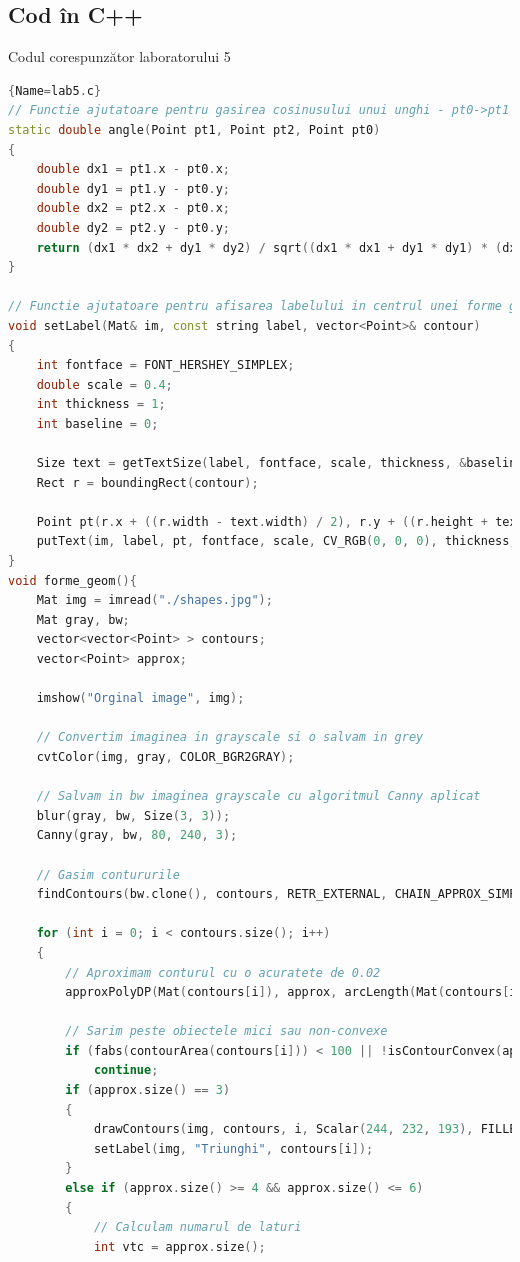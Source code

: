 \documentclass{amsart}
\begin{document}
\subsection{Cod \^{i}n C++}

Codul corespunzător laboratorului 5

\begin{lstlisting}[language=C++]{Name=lab5.c}
// Functie ajutatoare pentru gasirea cosinusului unui unghi - pt0->pt1 si pt0->pt2
static double angle(Point pt1, Point pt2, Point pt0)
{
	double dx1 = pt1.x - pt0.x;
	double dy1 = pt1.y - pt0.y;
	double dx2 = pt2.x - pt0.x;
	double dy2 = pt2.y - pt0.y;
	return (dx1 * dx2 + dy1 * dy2) / sqrt((dx1 * dx1 + dy1 * dy1) * (dx2 * dx2 + dy2 * dy2) + 1e-10);
}

// Functie ajutatoare pentru afisarea labelului in centrul unei forme geometrice
void setLabel(Mat& im, const string label, vector<Point>& contour)
{
	int fontface = FONT_HERSHEY_SIMPLEX;
	double scale = 0.4;
	int thickness = 1;
	int baseline = 0;

	Size text = getTextSize(label, fontface, scale, thickness, &baseline);
	Rect r = boundingRect(contour);

	Point pt(r.x + ((r.width - text.width) / 2), r.y + ((r.height + text.height) / 2));
	putText(im, label, pt, fontface, scale, CV_RGB(0, 0, 0), thickness, 8);
}
void forme_geom(){
	Mat img = imread("./shapes.jpg");
	Mat gray, bw;
	vector<vector<Point> > contours;
	vector<Point> approx;

	imshow("Orginal image", img);

	// Convertim imaginea in grayscale si o salvam in grey
	cvtColor(img, gray, COLOR_BGR2GRAY);

	// Salvam in bw imaginea grayscale cu algoritmul Canny aplicat
	blur(gray, bw, Size(3, 3));
	Canny(gray, bw, 80, 240, 3);

	// Gasim contururile
	findContours(bw.clone(), contours, RETR_EXTERNAL, CHAIN_APPROX_SIMPLE);

	for (int i = 0; i < contours.size(); i++)
	{
		// Aproximam conturul cu o acuratete de 0.02
		approxPolyDP(Mat(contours[i]), approx, arcLength(Mat(contours[i]), true) * 0.02, true);

		// Sarim peste obiectele mici sau non-convexe
		if (fabs(contourArea(contours[i])) < 100 || !isContourConvex(approx))
			continue;
		if (approx.size() == 3)
		{
			drawContours(img, contours, i, Scalar(244, 232, 193), FILLED);
			setLabel(img, "Triunghi", contours[i]);
		}
		else if (approx.size() >= 4 && approx.size() <= 6)
		{
			// Calculam numarul de laturi
			int vtc = approx.size();


\end{lstlisting}
\end{document}

